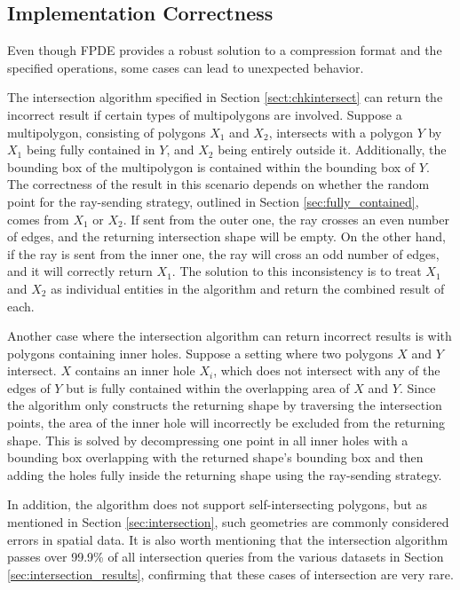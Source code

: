 \subsection{Implementation Correctness}
Even though FPDE provides a robust solution to a compression format and the specified operations, some cases can lead to unexpected behavior. 

 The intersection algorithm specified in Section \ref{sect:chkintersect} can return the incorrect result if certain types of multipolygons are involved. Suppose a multipolygon, consisting of polygons \(X_1\) and  \(X_2\), intersects with a polygon \(Y\) by \(X_1\) being fully contained in \(Y\), and \(X_2\) being entirely outside it. Additionally, the bounding box of the multipolygon is contained within the bounding box of \(Y\). The correctness of the result in this scenario depends on whether the random point for the ray-sending strategy, outlined in Section \ref{sec:fully_contained}, comes from \(X_1\) or \(X_2\). If sent from the outer one, the ray crosses an even number of edges, and the returning intersection shape will be empty. On the other hand, if the ray is sent from the inner one, the ray will cross an odd number of edges, and it will correctly return \(X_1\). The solution to this inconsistency is to treat \(X_1\) and \(X_2\) as individual entities in the algorithm and return the combined result of each. 
 
 Another case where the intersection algorithm can return incorrect results is with polygons containing inner holes. Suppose a setting where two polygons \(X\) and \(Y\) intersect. \(X\) contains an inner hole \(X_i\), which does not intersect with any of the edges of \(Y\) but is fully contained within the overlapping area of \(X\) and \(Y\). Since the algorithm only constructs the returning shape by traversing the intersection points, the area of the inner hole will incorrectly be excluded from the returning shape. This is solved by decompressing one point in all inner holes with a bounding box overlapping with the returned shape's bounding box and then adding the holes fully inside the returning shape using the ray-sending strategy. 
 
 
 In addition, the algorithm does not support self-intersecting polygons, but as mentioned in Section \ref{sec:intersection}, such geometries are commonly considered errors in spatial data. It is also worth mentioning that the intersection algorithm passes over 99.9\% of all intersection queries from the various datasets in Section \ref{sec:intersection_results}, confirming that these cases of intersection are very rare.


